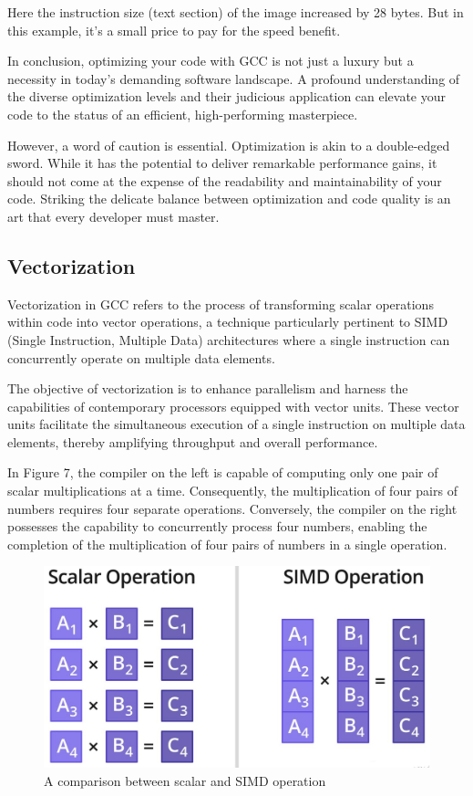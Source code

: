 \documentclass[conference]{IEEEtran}
\begin{document}
Here the instruction size (text section) of the image increased by 28 bytes. But in this example, it's a small price to pay for the speed benefit.\cite{b4}

In conclusion, optimizing your code with GCC is not just a luxury but a necessity in today's demanding software landscape. A profound understanding of the diverse optimization levels and their judicious application can elevate your code to the status of an efficient, high-performing masterpiece.

However, a word of caution is essential. Optimization is akin to a double-edged sword. While it has the potential to deliver remarkable performance gains, it should not come at the expense of the readability and maintainability of your code. Striking the delicate balance between optimization and code quality is an art that every developer must master.

\subsection{Vectorization}

Vectorization in GCC refers to the process of transforming scalar operations within code into vector operations, a technique particularly pertinent to SIMD (Single Instruction, Multiple Data) architectures where a single instruction can concurrently operate on multiple data elements.

The objective of vectorization is to enhance parallelism and harness the capabilities of contemporary processors equipped with vector units. These vector units facilitate the simultaneous execution of a single instruction on multiple data elements, thereby amplifying throughput and overall performance.

In Figure 7, the compiler on the left is capable of computing only one pair of scalar multiplications at a time. Consequently, the multiplication of four pairs of numbers requires four separate operations. Conversely, the compiler on the right possesses the capability to concurrently process four numbers, enabling the completion of the multiplication of four pairs of numbers in a single operation.

\begin{figure}[htbp]
\centering
\includegraphics [width=0.8\linewidth]{pictures/SIMD.png}
\caption{A comparison between scalar and SIMD operation\cite{b5}}
\label{fig7}
\end{figure}
\end{document}
